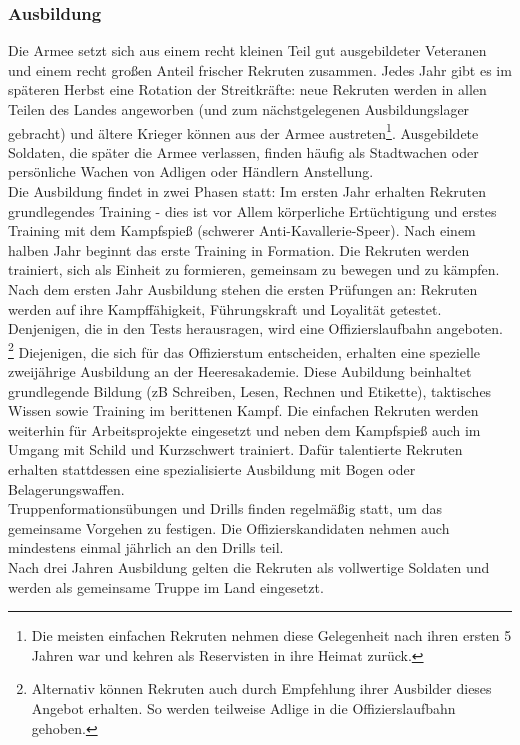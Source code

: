 \subsubsection{Ausbildung}
Die Armee setzt sich aus einem recht kleinen Teil gut ausgebildeter Veteranen und einem recht großen Anteil frischer Rekruten zusammen. 
Jedes Jahr gibt es im späteren Herbst eine Rotation der Streitkräfte: neue Rekruten werden in allen Teilen des Landes angeworben 
(und zum nächstgelegenen Ausbildungslager gebracht) und ältere Krieger können aus der Armee austreten\footnote{Die meisten einfachen Rekruten 
nehmen diese Gelegenheit nach ihren ersten 5 Jahren war und kehren als Reservisten in ihre Heimat zurück.}. Ausgebildete Soldaten, die später die Armee verlassen, 
finden häufig als Stadtwachen oder persönliche Wachen von Adligen oder Händlern Anstellung.\\
Die Ausbildung findet in zwei Phasen statt: Im ersten Jahr erhalten Rekruten grundlegendes Training - dies ist vor Allem körperliche 
Ertüchtigung und erstes Training mit dem Kampfspieß (schwerer Anti-Kavallerie-Speer). 
Nach einem halben Jahr beginnt das erste Training in Formation. Die Rekruten werden trainiert, sich als Einheit zu formieren, gemeinsam zu bewegen und zu kämpfen. 
Nach dem ersten Jahr Ausbildung stehen die ersten Prüfungen an: Rekruten werden auf ihre Kampffähigkeit, Führungskraft und Loyalität getestet. 
Denjenigen, die in den Tests herausragen, wird eine Offizierslaufbahn angeboten.
\footnote{Alternativ können Rekruten auch durch Empfehlung ihrer Ausbilder dieses Angebot erhalten. So werden teilweise Adlige in die Offizierslaufbahn gehoben.} 
Diejenigen, die sich für das Offizierstum entscheiden, erhalten eine spezielle zweijährige Ausbildung an der Heeresakademie. 
Diese Aubildung beinhaltet grundlegende Bildung (zB Schreiben, Lesen, Rechnen und Etikette), taktisches Wissen sowie Training im berittenen Kampf. 
Die einfachen Rekruten werden weiterhin für Arbeitsprojekte eingesetzt und neben dem Kampfspieß auch im Umgang mit Schild und Kurzschwert trainiert. 
Dafür talentierte Rekruten erhalten stattdessen eine spezialisierte Ausbildung mit Bogen oder Belagerungswaffen.\\
Truppenformationsübungen und Drills finden regelmäßig statt, um das gemeinsame Vorgehen zu festigen. 
Die Offizierskandidaten nehmen auch mindestens einmal jährlich an den Drills teil. \\
Nach drei Jahren Ausbildung gelten die Rekruten als vollwertige Soldaten und werden als gemeinsame Truppe im Land eingesetzt.

